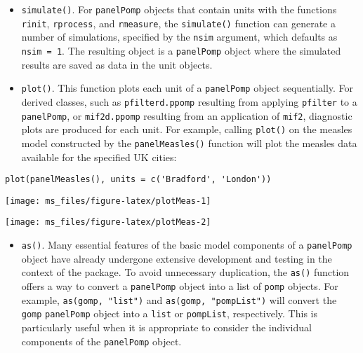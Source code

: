 \begin{itemize}
\tightlist
\item
  \texttt{simulate()}. For \texttt{panelPomp} objects that contain units with the functions \texttt{rinit}, \texttt{rprocess}, and \texttt{rmeasure}, the \texttt{simulate()} function can generate a number of simulations, specified by the \texttt{nsim} argument, which defaults as \texttt{nsim\ =\ 1}. The resulting object is a \texttt{panelPomp} object where the simulated results are saved as data in the unit objects.
\item
  \texttt{plot()}. This function plots each unit of a \texttt{panelPomp} object sequentially. For derived classes, such as \texttt{pfilterd.ppomp} resulting from applying \texttt{pfilter} to a \texttt{panelPomp}, or \texttt{mif2d.ppomp} resulting from an application of \texttt{mif2}, diagnostic plots are produced for each unit. For example, calling \texttt{plot()} on the measles model constructed by the \texttt{panelMeasles()} function will plot the measles data available for the specified UK cities:
\end{itemize}

\begin{verbatim}
plot(panelMeasles(), units = c('Bradford', 'London'))
\end{verbatim}

\begin{center}\texttt{[image: ms\_files/figure-latex/plotMeas-1]} \end{center}

\begin{center}\texttt{[image: ms\_files/figure-latex/plotMeas-2]} \end{center}

\begin{itemize}
\tightlist
\item
  \texttt{as()}. Many essential features of the basic model components of a \texttt{panelPomp} object have already undergone extensive development and testing in the context of the  package.
  To avoid unnecessary duplication, the \texttt{as()} function offers a way to convert a \texttt{panelPomp} object into a list of \texttt{pomp} objects.
  For example, \texttt{as(gomp,\ "list")} and \texttt{as(gomp,\ "pompList")} will convert the \texttt{gomp} \texttt{panelPomp} object into a \texttt{list} or \texttt{pompList}, respectively.
  This is particularly useful when it is appropriate to consider the individual components of the \texttt{panelPomp} object.
\end{itemize}

